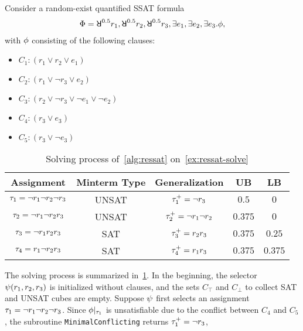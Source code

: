 \begin{example}
    \label{ex:ressat-solve}
    Consider a random-exist quantified SSAT formula
    \begin{align*}
        \Qf=\random{0.5}r_1,\random{0.5}r_2,\random{0.5}r_3,\exists e_1,\exists e_2,\exists e_3.\pf,
    \end{align*}
    with $\phi$ consisting of the following clauses:
    \begin{itemize}
        \item[] $C_1: (r_1 \lor r_2 \lor e_1)$
        \item[] $C_2: (r_1 \lor \lnot r_3 \lor e_2)$
        \item[] $C_3: (r_2 \lor \lnot r_3 \lor \lnot e_1 \lor \lnot e_2)$
        \item[] $C_4: (r_3 \lor e_3)$
        \item[] $C_5: (r_3 \lor \lnot e_3)$
    \end{itemize}
    \begin{table}[t]
        \centering
        \caption{Solving process of~\cref{alg:ressat} on~\cref{ex:ressat-solve}}
        \label{tbl:ressat-solve-example}
        \small
        \begin{tabular}{c|c|c|c|c}
            Assignment                            & Minterm Type & Generalization                & UB      & LB      \\
            \hline
            $\tau_1=\lnot r_1 \lnot r_2 \lnot r_3$ & UNSAT        & $\tau_1^+=\lnot r_3$           & $0.5$   & $0$     \\
            $\tau_2=\lnot r_1 \lnot r_2 r_3$       & UNSAT        & $\tau_2^+=\lnot r_1 \lnot r_2$ & $0.375$ & $0$     \\
            $\tau_3=\lnot r_1 r_2 r_3$             & SAT          & $\tau_3^+=r_2r_3$              & $0.375$ & $0.25$  \\
            $\tau_4=r_1 \lnot r_2 r_3$             & SAT          & $\tau_4^+=r_1r_3$              & $0.375$ & $0.375$
        \end{tabular}
    \end{table}
    The solving process is summarized in~\cref{tbl:ressat-solve-example}.
    In the beginning, the selector $\psi(r_1,r_2,r_3)$ is initialized without clauses,
    and the sets $C_\top$ and $C_\bot$ to collect SAT and UNSAT cubes are empty.
    Suppose $\psi$ first selects an assignment $\tau_1=\lnot r_1 \lnot r_2 \lnot r_3$.
    Since $\phi|_{\tau_1}$ is unsatisfiable due to the conflict between $C_4$ and $C_5$,
    the subroutine \texttt{MinimalConflicting} returns $\tau_1^+=\lnot r_3$,

\end{example}
